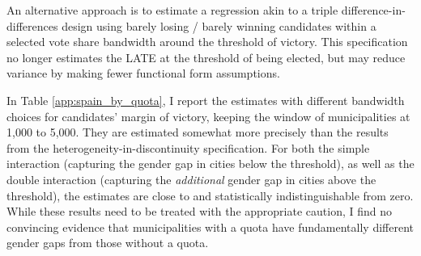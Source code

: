 \documentclass[12pt]{article}
\begin{document}
An alternative approach is to estimate a regression akin to a triple difference-in-differences design using barely losing / barely winning candidates within a selected vote share bandwidth around the threshold of victory. This specification no longer estimates the LATE at the threshold of being elected, but may reduce variance by making fewer functional form assumptions.

In Table \ref{app:spain_by_quota}, I report the estimates with different bandwidth choices for  candidates' margin of victory, keeping the window of municipalities at 1,000 to 5,000. They are estimated somewhat more precisely than the results from the heterogeneity-in-discontinuity specification. For both the simple interaction (capturing the gender gap in cities below the threshold), as well as the double interaction (capturing the \emph{additional} gender gap in cities above the threshold), the estimates are close to and statistically indistinguishable from zero. While these results need to be treated with the appropriate caution, I find no convincing evidence that municipalities with a quota have fundamentally different gender gaps from those without a quota.





\end{document}
